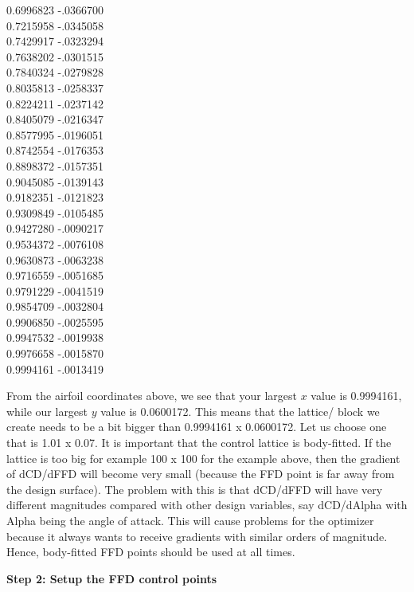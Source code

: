 \documentclass[12pt]{article}
\begin{document}
\begin{multicols}{2}
 0.6996823 -.0366700\\
 0.7215958 -.0345058\\
 0.7429917 -.0323294\\
 0.7638202 -.0301515\\
 0.7840324 -.0279828\\
 0.8035813 -.0258337\\
 0.8224211 -.0237142\\
 0.8405079 -.0216347\\
 0.8577995 -.0196051\\
 0.8742554 -.0176353\\
 0.8898372 -.0157351\\
 0.9045085 -.0139143\\
 0.9182351 -.0121823\\
 0.9309849 -.0105485\\
 0.9427280 -.0090217\\
 0.9534372 -.0076108\\
 0.9630873 -.0063238\\
 0.9716559 -.0051685\\
 0.9791229 -.0041519\\
 0.9854709 -.0032804\\
 0.9906850 -.0025595\\
 0.9947532 -.0019938\\
 0.9976658 -.0015870\\
 0.9994161 -.0013419\\
 \end{multicols}

\noindent From the airfoil coordinates above, we see that your largest $x$ value is 0.9994161, while our largest $y$ value is 0.0600172. This means that the lattice/ block we create needs to be a bit bigger than 0.9994161 x 0.0600172. Let us choose one that is 1.01 x 0.07. It is important that the control lattice is body-fitted. If the lattice is too big for example 100 x 100 for the example above, then the gradient of dCD/dFFD will become very small (because the FFD point is far away from the design surface). The problem with this is that dCD/dFFD will have very different magnitudes compared with other design variables, say dCD/dAlpha with Alpha being the angle of attack. This will cause problems for the optimizer because it always wants to receive gradients with similar orders of magnitude. Hence, body-fitted FFD points should be used at all times. \vspace{4mm} 

\noindent \textbf{Step 2: Setup the FFD control points}
\end{document}
